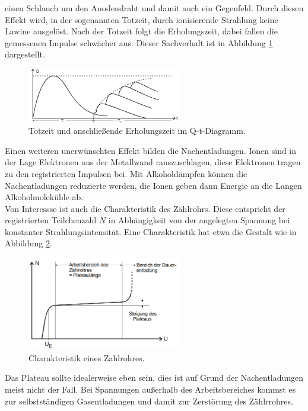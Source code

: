 einen Schlauch um den Anodendraht und damit auch ein Gegenfeld.
Durch diesen Effekt wird, in der sogenannten Totzeit, durch ionisierende Strahlung
keine Lawine ausgelöst. Nach der Totzeit folgt die Erholungszeit, dabei fallen die gemessenen Impulse schwächer aus. Dieser Sachverhalt ist in Abbildung
\ref{fig:totzeit} dargestellt.
\begin{figure}
  \centering
  \includegraphics[width=0.6\textwidth]{tz.PNG}
  \caption{Totzeit und anschließende Erholungszeit im Q-t-Diagramm.}
  \label{fig:totzeit}
\end{figure}
Einen weiteren unerwünschten Effekt bilden die Nachentladungen. Ionen sind in der Lage Elektronen aus der Metallwand rauszuschlagen,
diese Elektronen tragen zu den registrierten Impulsen bei. Mit Alkoholdämpfen können die Nachentladungen reduzierte werden, die
Ionen geben dann Energie an die Langen Alkoholmolekühle ab.\\
Von Interessse ist auch die Charakteristik des Zählrohrs. Diese entspricht der registrierten Teilchenzahl $N$ in Abhängigkeit von der
angelegten Spannung bei konstanter Strahlungsintensität. Eine Charakteristik hat etwa die Gestalt wie in Abbildung \ref{fig:char}.
\begin{figure}
  \centering
  \includegraphics[width=0.6\textwidth]{char.PNG}
  \caption{Charakteristik eines Zahlrohres.}
  \label{fig:char}
\end{figure}
Das Plateau sollte idealerweise eben sein, dies ist auf Grund der Nachentladungen meist nicht der Fall.
Bei Spannungen außerhalb des Arbeitsbereiches kommst es zur selbstständigen Gasentladungen und damit zur Zerstörung des Zählrrohres.
\newpage
